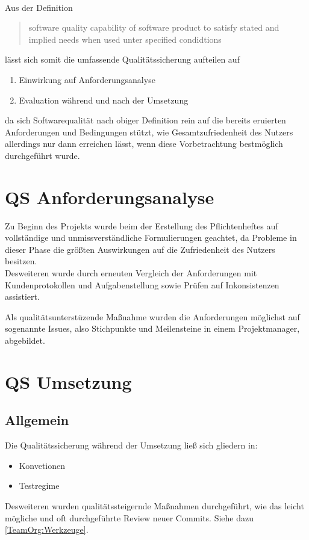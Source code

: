 \paragraph*{}Aus der Definition
\begin{quote}\label{PD_SQ}
software quality
capability of software product to satisfy stated and implied needs when used unter specified condidtions
\end{quote}\cite[4 Terms and definitions]{ISO25000}
lässt sich somit die umfassende Qualitätssicherung aufteilen auf
\begin{enumerate}
\item Einwirkung auf Anforderungsanalyse
\item Evaluation während und nach der Umsetzung
\end{enumerate}
da sich Softwarequalität nach obiger Definition rein auf die bereits eruierten Anforderungen und Bedingungen stützt, wie Gesamtzufriedenheit des Nutzers allerdings nur dann erreichen lässt, wenn diese Vorbetrachtung bestmöglich durchgeführt wurde.
\section{QS Anforderungsanalyse}
Zu Beginn des Projekts wurde beim der Erstellung des Pflichtenheftes auf vollständige und unmissverständliche Formulierungen geachtet, da Probleme in dieser Phase die größten Auswirkungen auf die Zufriedenheit des Nutzers besitzen.\\
Desweiteren wurde durch erneuten Vergleich der Anforderungen mit Kundenprotokollen und Aufgabenstellung sowie Prüfen auf Inkonsistenzen assistiert.

Als qualitätsunterstüzende Maßnahme wurden die Anforderungen möglichst auf sogenannte Issues, also Stichpunkte und Meilensteine in einem Projektmanager, abgebildet.
\section{QS Umsetzung}
\subsection{Allgemein}
Die Qualitätssicherung während der Umsetzung ließ sich gliedern in:
\begin{itemize}
\item Konvetionen
\item Testregime
\end{itemize}
Desweiteren wurden qualitätssteigernde Maßnahmen durchgeführt, wie das leicht mögliche und oft durchgeführte Review neuer Commits. Siehe dazu \ref{TeamOrg:Werkzeuge}.

